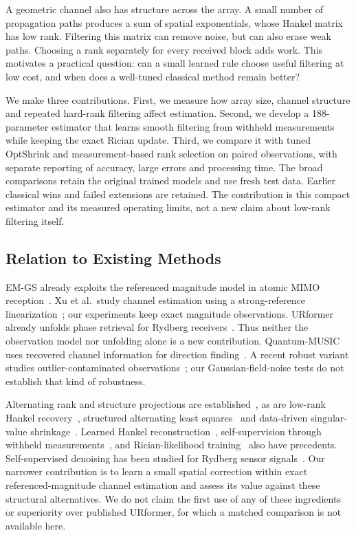 \documentclass[10pt,journal,letterpaper]{IEEEtran}
\begin{document}
A geometric channel also has structure across the array. A small number of propagation paths produces a sum of spatial exponentials, whose Hankel matrix has low rank. Filtering this matrix can remove noise, but can also erase weak paths. Choosing a rank separately for every received block adds work. This motivates a practical question: can a small learned rule choose useful filtering at low cost, and when does a well-tuned classical method remain better?

We make three contributions. First, we measure how array size, channel structure and repeated hard-rank filtering affect estimation. Second, we develop a 188-parameter estimator that learns smooth filtering from withheld measurements while keeping the exact Rician update. Third, we compare it with tuned OptShrink and measurement-based rank selection on paired observations, with separate reporting of accuracy, large errors and processing time. The broad comparisons retain the original trained models and use fresh test data. Earlier classical wins and failed extensions are retained. The contribution is this compact estimator and its measured operating limits, not a new claim about low-rank filtering itself.

\subsection{Relation to Existing Methods}
EM-GS already exploits the referenced magnitude model in atomic MIMO reception~\cite{cui2025}. Xu et al.\ study channel estimation using a strong-reference linearization~\cite{xu2025}; our experiments keep exact magnitude observations. URformer already unfolds phase retrieval for Rydberg receivers~\cite{xiao2026}. Thus neither the observation model nor unfolding alone is a new contribution. Quantum-MUSIC uses recovered channel information for direction finding~\cite{kim2025quantummusic}. A recent robust variant studies outlier-contaminated observations~\cite{banerjee2026robust}; our Gaussian-field-noise tests do not establish that kind of robustness.

Alternating rank and structure projections are established~\cite{cadzow1988}, as are low-rank Hankel recovery~\cite{chen2014emac,yin2021}, structured alternating least squares~\cite{zachariah2012} and data-driven singular-value shrinkage~\cite{nadakuditi2014}. Learned Hankel reconstruction~\cite{huang2021}, self-supervision through withheld measurements~\cite{yaman2020,luo2023}, and Rician-likelihood training~\cite{parker2023} also have precedents. Self-supervised denoising has been studied for Rydberg sensor signals~\cite{liu2026}. Our narrower contribution is to learn a small spatial correction within exact referenced-magnitude channel estimation and assess its value against these structural alternatives. We do not claim the first use of any of these ingredients or superiority over published URformer, for which a matched comparison is not available here.
\end{document}
